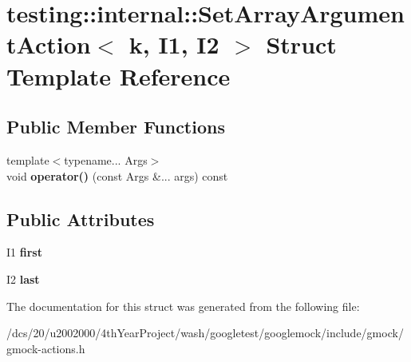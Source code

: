 \hypertarget{structtesting_1_1internal_1_1SetArrayArgumentAction}{}\section{testing\+:\+:internal\+:\+:Set\+Array\+Argument\+Action$<$ k, I1, I2 $>$ Struct Template Reference}
\label{structtesting_1_1internal_1_1SetArrayArgumentAction}
\subsection*{Public Member Functions}
\begin{DoxyCompactItemize}
\item 
\mbox{\label{structtesting_1_1internal_1_1SetArrayArgumentAction_a2ce5599069cf164d0c880dca6371ccbf}} 
{\footnotesize template$<$typename... Args$>$ }\\void {\bfseries operator()} (const Args \&... args) const
\end{DoxyCompactItemize}
\subsection*{Public Attributes}
\begin{DoxyCompactItemize}
\item 
\mbox{\label{structtesting_1_1internal_1_1SetArrayArgumentAction_a79b1b44f5838949c0162de4b74b68fe3}} 
I1 {\bfseries first}
\item 
\mbox{\label{structtesting_1_1internal_1_1SetArrayArgumentAction_a24f143788df5e8cb21d9bb0595ff69ba}} 
I2 {\bfseries last}
\end{DoxyCompactItemize}


The documentation for this struct was generated from the following file\+:\begin{DoxyCompactItemize}
\item 
/dcs/20/u2002000/4th\+Year\+Project/wash/googletest/googlemock/include/gmock/gmock-\/actions.\+h\end{DoxyCompactItemize}
